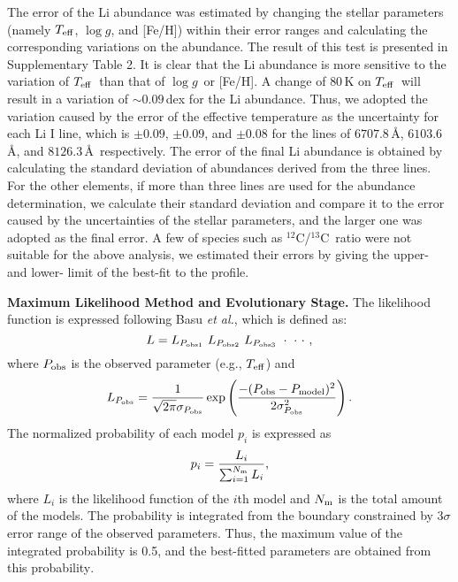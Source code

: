 \documentclass[twoside,onecolumnm,12pt]{article}
\newcommand{\upcite}[1]{\textsuperscript{\textsuperscript{\cite{#1}}}}
\newcommand{\Teff}{$T_{\rm eff}$}
\newcommand{\logg}{$\log g$}
\newcommand{\ciso}{$^{12}$C/$^{13}$C}
\begin{document}
The error of the Li abundance was estimated by changing the stellar parameters (namely \Teff, \logg, and [Fe/H]) within their error ranges and calculating the corresponding variations on the abundance. The result of this test is presented in Supplementary Table 2. It is clear that the Li abundance is more sensitive to the variation of \Teff\ than that of \logg\ or [Fe/H]. A change of $80$\,K on \Teff\ will result in a variation of $\sim 0.09$\,dex for the Li abundance. Thus, we adopted the variation caused by the error of the effective temperature as the uncertainty for each Li I line, which is $\pm0.09$, $\pm0.09$, and $\pm0.08$ for the lines of $6707.8$\,\AA, $6103.6$\,\AA, and $8126.3$\,\AA\, respectively. The error of the final Li abundance is obtained by calculating the standard deviation of abundances derived from the three lines. For the other elements, if more than three lines are used for the abundance determination, we calculate their standard deviation and compare it to the error caused by the uncertainties of the stellar parameters, and the larger one was adopted as the final error. A few of species such as \ciso\ ratio were not suitable for the above analysis, we estimated their errors by giving the upper- and lower- limit of the best-fit to the profile.


\vspace{10pt}
\noindent\textbf{Maximum Likelihood Method and Evolutionary Stage.} The likelihood function is expressed following Basu \emph{et al.}\upcite{Basu2010}, which is defined as:
  \begin{equation}
  \label{e1}
    L=L_{P_{\rm{obs1}}}\ L_{P_{\rm{obs2}}}\ L_{P_{\rm{obs3}}}\ \cdot\ \cdot\ \cdot\ ,
  \end{equation}
where $P_{\rm{obs}}$ is the observed parameter (e.g., \Teff) and
  \begin{equation}
  \label{e2}
    L_{P_{\rm{obs}}} =\frac{1}{\sqrt{2\pi} \sigma_{P_{\rm{obs}}}}\exp\left(\frac{-(P_{\rm{obs}}-P_{\rm{model}})^2}{2\sigma_{P_{\rm{obs}}}^2}\right).
  \end{equation}
The normalized probability of each model $p_{i}$ is expressed as
  \begin{equation}
    p_{i}=\frac{L_{i}}{\sum_{i=1}^{N_{\rm m}}L_{i}},
  \end{equation}
where $L_{i}$ is the likelihood function of the $i$th model and $N_{\rm m}$ is the total amount of the models. The probability is integrated from the boundary constrained by 3$\sigma$ error range of the observed parameters. 
Thus, the maximum value of the integrated probability is 0.5, and the best-fitted parameters are obtained from this probability\upcite{Wu2017}.
\end{document}
